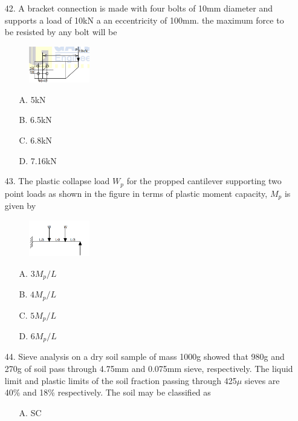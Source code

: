 \documentclass[journal]{IEEEtran}
\begin{document}
\begin{enumerate}
  \item[42.] A bracket connection is made with four bolts of 10mm diameter and supports a
  load of 10kN a an eccentricity of 100mm. the maximum force to be resisted by
  any bolt will be 
  \begin{figure}[h!]
    \centering
    \includegraphics[width=0.25\textwidth]{figs/Fig_4.png}  %
    \label{fig:sample4}
\end{figure}
  \begin{enumerate}
    \item [A.] 5kN
    \item [B.] 6.5kN
    \item [C.] 6.8kN
    \item [D.] 7.16kN
  \end{enumerate}
  \item [43.] The plastic collapse load $W_p$ for the propped cantilever supporting two point loads
  as shown in the figure in terms of plastic moment capacity, $M_p$ is given by 
  \begin{figure}[h!]
    \centering
    \includegraphics[width=0.25\textwidth]{figs/Fig_5.png}  %
    \label{fig:sample5}
\end{figure}
  \begin{enumerate}
    \item [A.] $3M_p/L$
    \item [B.] $4M_p/L$
    \item [C.] $5M_p/L$
    \item [D.] $6M_p/L$
  \end{enumerate}
  \item [44.] Sieve analysis on a dry soil sample of mass 1000g showed that 980g and 270g of
  soil pass through 4.75mm and 0.075mm sieve, respectively. The liquid limit and
  plastic limits of the soil fraction passing through 425$\mu$ sieves are 40\% and 18\%
  respectively. The soil may be classified as 
  \begin{enumerate}
    \item [A.] SC

\end{enumerate}
\end{enumerate}
\end{document}
